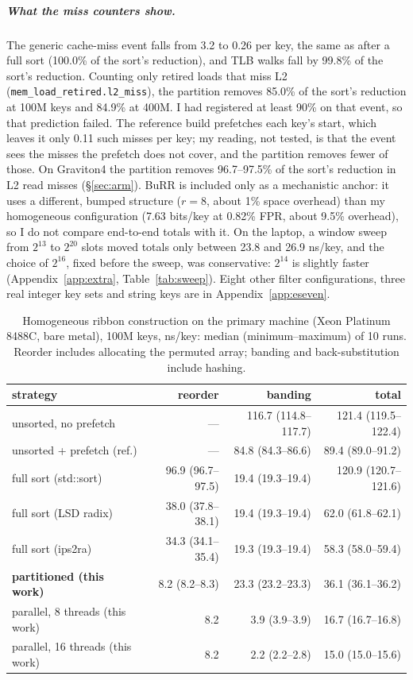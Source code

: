 \documentclass[a4paper,UKenglish,cleveref,autoref,thm-restate,anonymous]{lipics-v2021}
\begin{document}
\subparagraph*{What the miss counters show.} The generic cache-miss event falls from 3.2 to 0.26 per key, the same as after a full sort (100.0\% of the sort's reduction), and TLB walks fall by 99.8\% of the sort's reduction. Counting only retired loads that miss L2 (\texttt{mem\_load\_retired.l2\_miss}), the partition removes 85.0\% of the sort's reduction at 100M keys and 84.9\% at 400M. I had registered at least 90\% on that event, so that prediction failed. The reference build prefetches each key's start, which leaves it only 0.11 such misses per key; my reading, not tested, is that the event sees the misses the prefetch does not cover, and the partition removes fewer of those. On Graviton4 the partition removes 96.7--97.5\% of the sort's reduction in L2 read misses (\S\ref{sec:arm}). BuRR is included only as a mechanistic anchor: it uses a different, bumped structure ($r=8$, about 1\% space overhead) than my homogeneous configuration (7.63 bits/key at 0.82\% FPR, about 9.5\% overhead), so I do not compare end-to-end totals with it. On the laptop, a window sweep from $2^{13}$ to $2^{20}$ slots moved totals only between 23.8 and 26.9 ns/key, and the choice of $2^{16}$, fixed before the sweep, was conservative: $2^{14}$ is slightly faster (Appendix~\ref{app:extra}, Table~\ref{tab:sweep}). Eight other filter configurations, three real integer key sets and string keys are in Appendix~\ref{app:eseven}.

\begin{table}
\caption{Homogeneous ribbon construction on the primary machine (Xeon Platinum 8488C, bare
metal), 100M keys, ns/key: median (minimum--maximum) of 10 runs. Reorder includes allocating the
permuted array; banding and back-substitution include hashing.}
\label{tab:ribbon}
\small\setlength{\tabcolsep}{4pt}
\begin{tabular}{lrrr}
\toprule
strategy & reorder & banding & total \\
\midrule
unsorted, no prefetch & --- & 116.7 (114.8--117.7) & 121.4 (119.5--122.4) \\
unsorted + prefetch (ref.) & --- & 84.8 (84.3--86.6) & 89.4 (89.0--91.2) \\
full sort (std::sort) & 96.9 (96.7--97.5) & 19.4 (19.3--19.4) & 120.9 (120.7--121.6) \\
full sort (LSD radix) & 38.0 (37.8--38.1) & 19.4 (19.3--19.4) & 62.0 (61.8--62.1) \\
full sort (ips2ra) & 34.3 (34.1--35.4) & 19.3 (19.3--19.4) & 58.3 (58.0--59.4) \\
\textbf{partitioned (this work)} & 8.2 (8.2--8.3) & 23.3 (23.2--23.3) & 36.1 (36.1--36.2) \\
\midrule
parallel, 8 threads (this work) & 8.2 & 3.9 (3.9--3.9) & 16.7 (16.7--16.8) \\
parallel, 16 threads (this work) & 8.2 & 2.2 (2.2--2.8) & 15.0 (15.0--15.6) \\
\bottomrule
\end{tabular}
\end{table}
\end{document}

